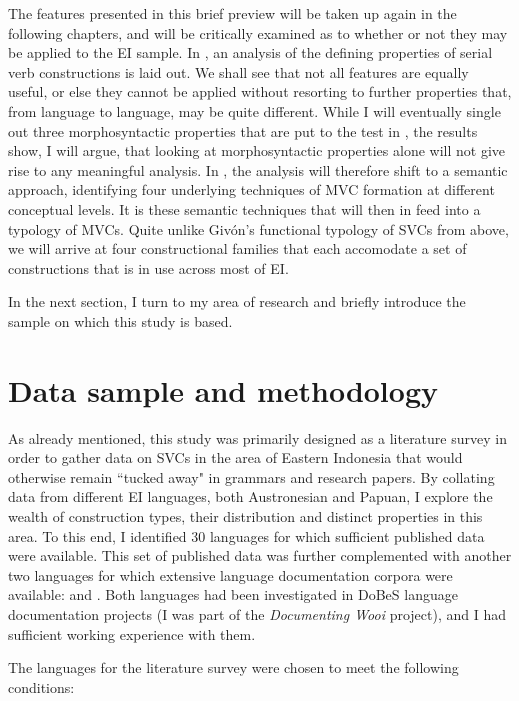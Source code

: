 The features presented in this brief preview will be taken up again in the following chapters, and will be critically examined as to whether or not they may be applied to the EI sample. In , an analysis of the defining properties of serial verb constructions is laid out. We shall see that not all features are equally useful, or else they cannot be applied without resorting to further properties that, from language to language, may be quite different. While I will eventually single out three morphosyntactic properties that are put to the test in , the results  show, I will argue, that looking at morphosyntactic properties alone will not give rise to any meaningful analysis. In , the analysis will therefore shift to a semantic approach, identifying four underlying techniques of MVC formation at different conceptual levels. It is these semantic techniques that will then in  feed into a typology of MVCs. Quite unlike Givón's functional typology of SVCs from above, we will arrive at four constructional families that each accomodate a set of constructions that is in use across most of EI.

In the next section, I turn to my area of research and briefly introduce the sample on which this study is based.

\section{Data sample and methodology}\label{sec:data}

As already mentioned, this study was primarily designed as a literature survey in order to gather data on SVCs in the area of Eastern Indonesia that would otherwise remain ``tucked away" in grammars and research papers. By collating data from different EI languages, both Austronesian and Papuan, I explore the wealth of construction types, their distribution and distinct properties in this area. To this end, I identified 30 languages for which sufficient published data were available. This set of published data was further complemented with another two languages for which extensive language documentation corpora were available:  and . Both languages had been investigated in DoBeS language documentation projects (I was part of the \textit{Documenting Wooi} project), and I had sufficient working experience with them. 

The languages for the literature survey were chosen to meet the following conditions:

